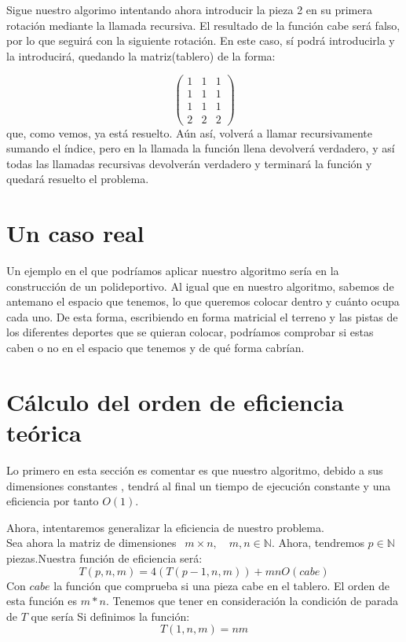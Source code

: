 \documentclass[a4paper, 11pt]{article}
\begin{document}
Sigue nuestro algorimo intentando ahora introducir la pieza 2 en su primera rotación mediante la llamada recursiva. El resultado de la función cabe será falso, por lo que seguirá con la siguiente rotación. En este caso, sí podrá introducirla y la introducirá, quedando la matriz(tablero) de la forma:

\[
\begin{pmatrix}
 1 & 1 & 1 \\
1 & 1 & 1\\
1 & 1 & 1\\
2 & 2 & 2
\end{pmatrix} 
\]
que, como vemos, ya está resuelto. Aún así, volverá a llamar recursivamente sumando el índice, pero en la llamada la función llena devolverá verdadero, y así todas las llamadas recursivas devolverán verdadero y terminará la función y quedará resuelto el problema.


\section{Un caso real}

Un ejemplo en el que podríamos aplicar nuestro algoritmo sería en la construcción de un polideportivo. Al igual que en nuestro algoritmo, sabemos de antemano el espacio que tenemos, lo que queremos colocar dentro y cuánto ocupa cada uno. De esta forma, escribiendo en forma matricial el terreno y las pistas de los diferentes deportes que se quieran colocar, podríamos comprobar si estas caben o no en el espacio que tenemos y de qué forma cabrían.

\section{Cálculo del orden de eficiencia teórica}

Lo primero en esta sección es comentar es que nuestro algoritmo, debido a sus dimensiones constantes , tendrá al final un tiempo de ejecución constante y una eficiencia por tanto $O(1)$.

Ahora, intentaremos generalizar la eficiencia de nuestro problema.\\

Sea ahora la matriz de dimensiones $\ \ m\times n, \quad m,n \in \mathbb N$. Ahora, tendremos $p\in \mathbb N$ piezas.Nuestra función de eficiencia será:
\[
T(p,n,m) = 4(T(p-1,n,m)) + mnO(cabe)
\]
Con $cabe$ la función que comprueba si una pieza cabe en el tablero. El orden de esta función es $m*n$. Tenemos que tener en consideración la condición de parada de $T$ que sería
Si definimos la función:
\[
T(1,n,m) = nm
\]
\end{document}
